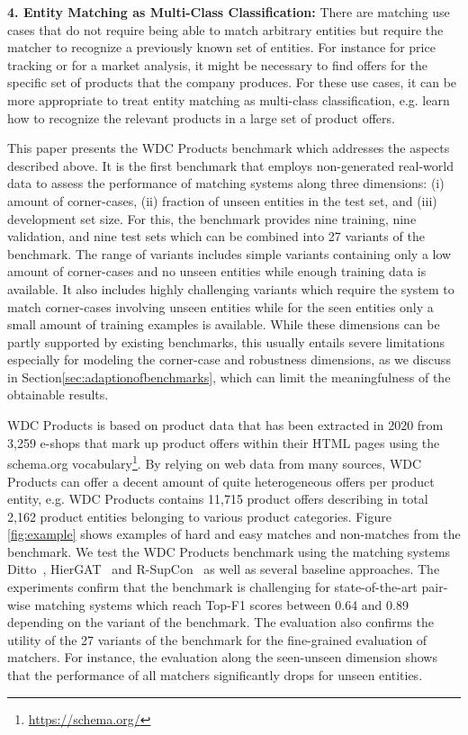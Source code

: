 \documentclass[sigconf,edbt]{acmart-edbt2024}
\begin{document}
\textbf{4. Entity Matching as Multi-Class Classification:} There are matching use cases that do not require being able to match arbitrary entities but require the matcher to recognize a previously known set of entities. For instance for price tracking or for a market analysis, it might be necessary to find offers for the specific set of products that the company produces. For these use cases, it can be more appropriate to treat entity matching as multi-class classification, e.g. learn how to recognize the relevant products in a large set of product offers.

This paper presents the WDC Products benchmark which addresses the aspects described above. 
It is the first benchmark that employs non-generated real-world data to assess the performance of matching systems along three dimensions: (i) amount of corner-cases, (ii) fraction of unseen entities in the test set, and (iii) development set size. For this, the benchmark provides nine training, nine validation, and nine test sets which can be combined into 27 variants of the benchmark. The range of variants includes simple variants containing only a low amount of corner-cases and no unseen entities while enough training data is available. It also includes highly challenging variants which require the system to match corner-cases involving unseen entities while for the seen entities only a small amount of training examples is available. While these dimensions can be partly supported by existing benchmarks, this usually entails severe limitations especially for modeling the corner-case and robustness dimensions, as we discuss in Section\ref{sec:adaptionofbenchmarks}, which can limit the meaningfulness of the obtainable results.

WDC Products is based on product data that has been extracted in 2020 from 3,259 e-shops that mark up product offers within their HTML pages using the schema.org vocabulary\footnote{\url{https://schema.org/}}. By relying on web data from many sources, WDC Products can offer a decent amount of quite heterogeneous offers per product entity, e.g. WDC Products contains 11,715 product offers describing in total 2,162 product entities belonging to various product categories. Figure \ref{fig:example} shows examples of hard and easy matches and non-matches from the benchmark. 
We test the WDC Products benchmark using the matching systems Ditto~\cite{liDeepEntityMatching2020}, HierGAT~\cite{yaoEntityResolutionHierarchical2022} and R-SupCon~\cite{peetersSupervisedContrastiveLearning2022a} as well as several baseline approaches. The experiments confirm that the benchmark is challenging for state-of-the-art pair-wise matching systems which reach Top-F1 scores between 0.64 and 0.89 depending on the variant of the benchmark. The evaluation also confirms the utility of the 27 variants of the benchmark for the fine-grained evaluation of matchers. For instance, the evaluation along the seen-unseen dimension shows that the performance of all matchers significantly drops for unseen entities.
\end{document}
